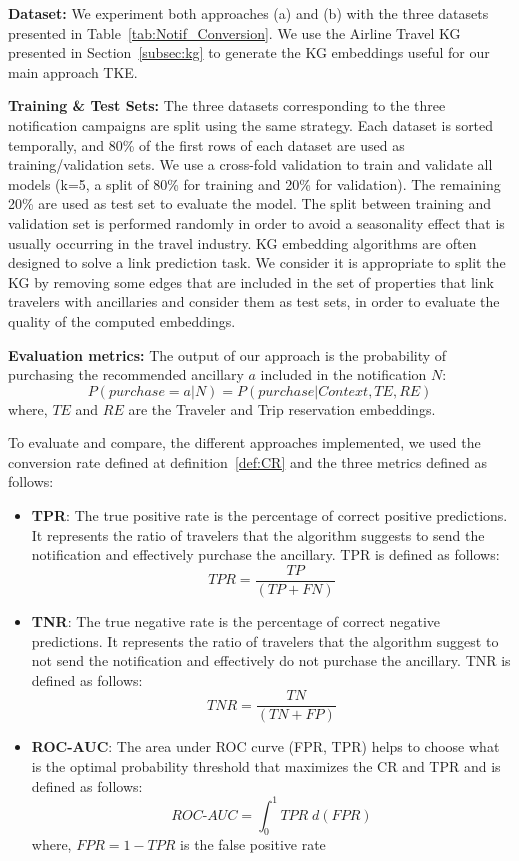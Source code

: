 \documentclass[11pt,dvipdfm]{article}
\begin{document}
\textbf{Dataset:} We experiment both approaches (a) and (b) with the three datasets presented in Table~\ref{tab:Notif_Conversion}. We use the Airline Travel KG presented in Section~\ref{subsec:kg} to generate the KG embeddings useful for our main approach TKE.

\textbf{Training \& Test Sets:} The three datasets corresponding to the three notification campaigns are split using the same strategy. Each dataset is sorted temporally, and 80\% of the first rows of each dataset are used as training/validation sets. We use a cross-fold validation to train and validate all models (k=5, a split of 80\% for training and 20\% for validation). The remaining 20\% are used as test set to evaluate the model. The split between training and validation set is performed randomly in order to avoid a seasonality effect that is usually occurring in the travel industry. KG embedding algorithms are often designed to solve a link prediction task. We consider it is appropriate to split the KG by removing some edges that are included in the set of properties that link travelers with ancillaries and consider them as test sets, in order to evaluate the quality of the computed embeddings.

\textbf{Evaluation metrics:} The output of our approach is the probability of purchasing the recommended ancillary $a$ included in the notification $N$:
\begin{equation}
    P(purchase = a|N) = P(purchase|Context, TE, RE)
\end{equation}
where, $TE$ and $RE$ are the Traveler and Trip reservation embeddings.

To evaluate and compare, the different approaches implemented, we used the conversion rate defined at definition~\ref{def:CR} and the three metrics defined as follows: 
\begin{itemize}
 \item \textbf{TPR}: The true positive rate is the percentage of correct positive predictions. It represents the ratio of travelers that the algorithm suggests to send the notification and effectively purchase the ancillary. TPR is defined as follows:
    \begin{equation}
        TPR = \frac{TP}{(TP+FN)}
    \end{equation}
 \item \textbf{TNR}: The true negative rate is the percentage of correct negative predictions. It represents the ratio of travelers that the algorithm suggest to not send the notification and effectively do not purchase the ancillary. TNR is defined as follows:
    \begin{equation}
        TNR = \frac{TN}{(TN+FP)}
    \end{equation}
 \item \textbf{ROC-AUC}: The area under ROC curve (FPR, TPR) helps to choose what is the optimal probability threshold that maximizes the CR and TPR and is defined as follows:
    \begin{equation}
        ROC\textrm{-}AUC = \int_{0}^{1} TPR \; d(FPR)
    \end{equation}
 where, $FPR = 1-TPR$ is the false positive rate
\end{itemize}
\end{document}
